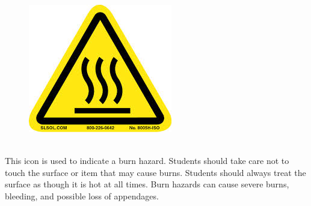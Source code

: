 \documentclass[nohyper,nobib]{tufte-book}
\begin{document}
\begin{framed}
\begin{figure}
\includegraphics[width=\linewidth]{images/burn_hazard.jpg}
\end{figure}
\ \\
This icon is used to indicate a burn hazard.  Students should take care not to touch the surface or item that may cause burns.  Students should always treat the surface as though it is hot at all times.  Burn hazards can cause severe burns, bleeding, and possible loss of appendages.
\end{framed}
\newpage
\end{document}
